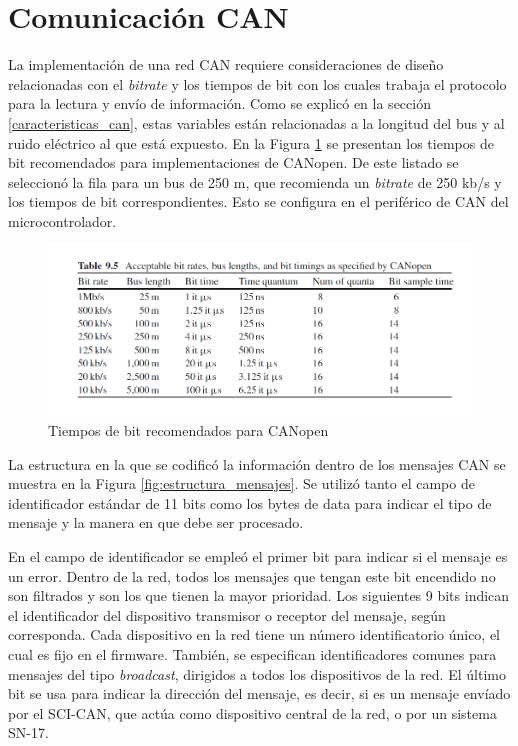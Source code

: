\section{Comunicación CAN}
\label{comunicacion_can}

La implementación de una red CAN requiere consideraciones de diseño relacionadas con el \textit{bitrate} y los tiempos de bit con los cuales trabaja el protocolo para la lectura y envío de información. Como se explicó en la sección \ref{caracteristicas_can}, estas variables están relacionadas a la longitud del bus y al ruido eléctrico al que está expuesto. En la Figura \ref{fig:bit_times} se presentan los tiempos de bit recomendados para implementaciones de CANopen\citep{Understanding_CAN}. De este listado se seleccionó la fila para un bus de 250 m, que recomienda un \textit{bitrate} de 250 kb/s y los tiempos de bit correspondientes. Esto se configura en el periférico de CAN del microcontrolador.

\begin{figure}[htbp]
	\centering
	\includegraphics[scale=.5]{./Figures/bit_times_recomendados.PNG}
	\caption{Tiempos de bit recomendados para CANopen}
	\label{fig:bit_times}
\end{figure}

La estructura en la que se codificó la información dentro de los mensajes CAN se muestra en la Figura \ref{fig:estructura_mensajes}. Se utilizó tanto el campo de identificador estándar de 11 bits como los bytes de data para indicar el tipo de mensaje y la manera en que debe ser procesado.

En el campo de identificador se empleó el primer bit para indicar si el mensaje es un error. Dentro de la red, todos los mensajes que tengan este bit encendido no son filtrados y son los que tienen la mayor prioridad. Los siguientes 9 bits indican el identificador del dispositivo transmisor o receptor del mensaje, según corresponda. Cada dispositivo en la red tiene un número identificatorio único, el cual es fijo en el firmware. También, se especifican identificadores comunes para mensajes del tipo \textit{broadcast}, dirigidos a todos los dispositivos de la red. El último bit se usa para indicar la dirección del mensaje, es decir, si es un mensaje envíado por el SCI-CAN, que actúa como dispositivo central de la red, o por un sistema SN-17.

